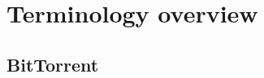 \documentclass[conference]{IEEEtran}
\begin{document}


\section{Terminology overview}
\subsection{BitTorrent}
\end{document}
